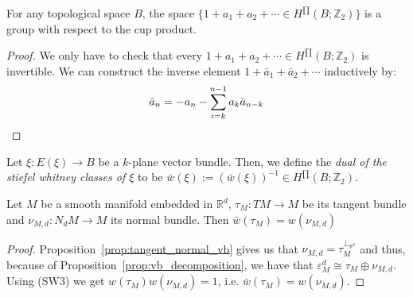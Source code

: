 \begin{lemma} For any topological space $B$, the space $\big\{1+a_1+a_2+\cdots\in H^{\prod}(B;\mathbb{Z}_2)\big\}$ is a group with respect to the cup product.
\end{lemma}
\begin{proof} We only have to check that every $1+a_1+a_2+\cdots\in H^{\prod}(B;\mathbb{Z}_2)$ is invertible. We can construct the inverse element $1+\bar{a}_1+\bar{a}_2+\cdots$ inductively by:
\[\bar{a}_n=-a_n-\sum_{i=k}^{n-1}a_k\bar{a}_{n-k}\qedhere\]
\end{proof}

\begin{definition}\label{def:dual_sw} Let $\xi:E(\xi)\to B$ be a $k$-plane vector bundle. Then, we define the \emph{dual of the stiefel whitney classes of $\xi$} to be $\bar{w}(\xi):=(\bar{w}(\xi))^{-1}\in H^{\prod}(B;\mathbb{Z}_2)$.
\end{definition}

\begin{proposition} Let $M$ be a smooth manifold embedded in $\mathbb{R}^d$, $\tau_M:TM\to M$ be its tangent bundle and $\nu_{M,d}:N_dM\to M$ its normal bundle. Then $\bar{w}(\tau_M)=w(\nu_{M,d})$
\end{proposition}
\begin{proof} Proposition~\ref{prop:tangent_normal_vb} gives us that $\nu_{M,d}=\tau_M^{\perp_{\mathbb{R}^d}}$ and thus, because of Proposition~\ref{prop:vb_decomposition}, we have that $\varepsilon_M^d\cong\tau_M\oplus\nu_{M,d}$. Using (SW3) we get $w(\tau_M)w(\nu_{M,d})=1$, i.e. $\bar{w}(\tau_M)=w(\nu_{M,d})$.
\end{proof}

